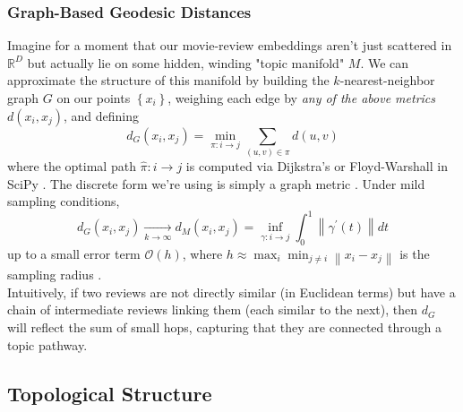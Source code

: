 \documentclass[fleqn,10pt]{SelfArx}
\begin{document}
\subsubsection{Graph-Based Geodesic Distances}
Imagine for a moment that our movie-review embeddings aren't just scattered in $\mathbb{R}^D$ but actually lie on some hidden, winding "topic manifold" $M$. We can approximate the structure of this manifold by building the $k$-nearest-neighbor graph $G$ on our points $\left\{x_i\right\}$, weighing each edge by \textit{any of the above metrics} $d\left(x_i, x_j\right)$, and defining
$$
d_G\left(x_i, x_j\right)=\min _{\pi: i \rightarrow j} \sum_{(u, v) \in \pi} d(u, v)
$$
where the optimal path $\hat{\pi}: i \rightarrow j$ is computed via Dijkstra's or Floyd-Warshall in SciPy \cite{virtanen2020scipy}. The discrete form we're using is simply a graph metric \cite{tenenbaum2000global}. Under mild sampling conditions,
$$
d_G\left(x_i, x_j\right) \xrightarrow[k \rightarrow \infty]{ } d_{M}\left(x_i, x_j\right)=\inf _{\gamma: i \rightarrow j} \int_0^1\left\|\gamma^{\prime}(t)\right\| d t
$$
up to a small error term $\mathcal{O}(h)$, where $h \approx \max _i \min _{j \neq i}\left\|x_i-x_j\right\|$ is the sampling radius \cite{tenenbaum2000global}.\\
Intuitively, if two reviews are not directly similar (in Euclidean terms) but have a chain of intermediate reviews linking them (each similar to the next), then $d_G$ will reflect the sum of small hops, capturing that they are connected through a topic pathway.

\subsection{Topological Structure}
\end{document}
